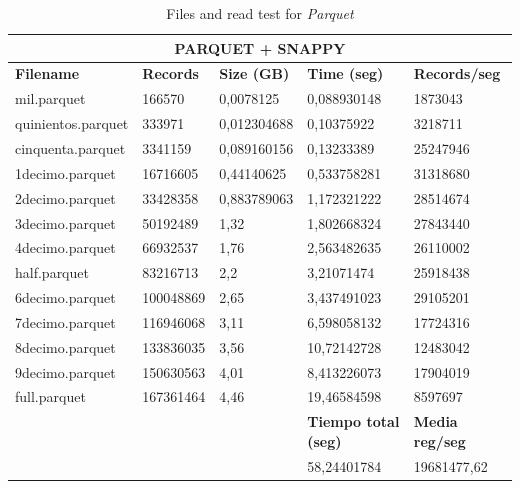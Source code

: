 \begin{table}[htp!]
	\centering
	\caption{Files and read test for \textit{Parquet}}
	\label{velocidadParquetEN}
	\begin{tabular}{|l|l|l|l|l|}
		\hline
		\multicolumn{5}{|c|}{\textbf{PARQUET + SNAPPY}}                                                                          \\ \hline
		\textbf{Filename} & \textbf{Records} & \textbf{Size (GB)} & \textbf{Time (seg)} & \textbf{Records/seg} \\ \hline
		mil.parquet        & 166570             & 0,0078125            & 0,088930148                 & 1873043                    \\ \hline
		quinientos.parquet & 333971             & 0,012304688          & 0,10375922                  & 3218711                    \\ \hline
		cinquenta.parquet  & 3341159            & 0,089160156          & 0,13233389                  & 25247946                   \\ \hline
		1decimo.parquet    & 16716605           & 0,44140625           & 0,533758281                 & 31318680                   \\ \hline
		2decimo.parquet    & 33428358           & 0,883789063          & 1,172321222                 & 28514674                   \\ \hline
		3decimo.parquet    & 50192489           & 1,32                 & 1,802668324                 & 27843440                   \\ \hline
		4decimo.parquet    & 66932537           & 1,76                 & 2,563482635                 & 26110002                   \\ \hline
		half.parquet       & 83216713           & 2,2                  & 3,21071474                  & 25918438                   \\ \hline
		6decimo.parquet    & 100048869          & 2,65                 & 3,437491023                 & 29105201                   \\ \hline
		7decimo.parquet    & 116946068          & 3,11                 & 6,598058132                 & 17724316                   \\ \hline
		8decimo.parquet    & 133836035          & 3,56                 & 10,72142728                 & 12483042                   \\ \hline
		9decimo.parquet    & 150630563          & 4,01                 & 8,413226073                 & 17904019                   \\ \hline
		full.parquet       & 167361464          & 4,46                 & 19,46584598                 & 8597697                    \\ \hline
		                   &                    &                      & \textbf{Tiempo total (seg)} & \textbf{Media reg/seg}     \\ \hline
						   &                    &                      & 58,24401784                 & 19681477,62                \\ \hline
	\end{tabular}
\end{table}

